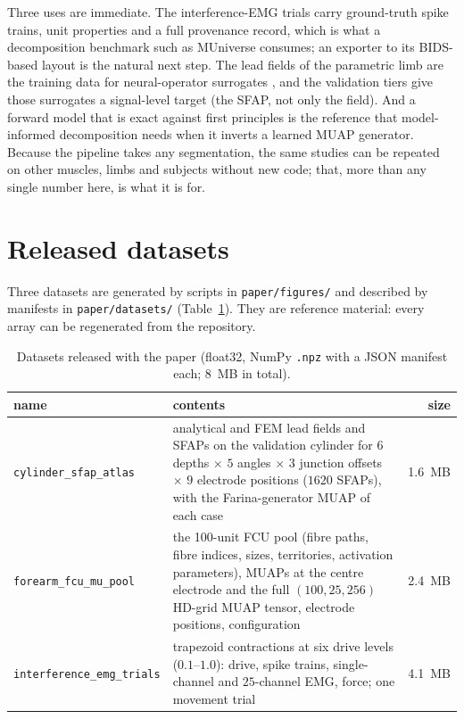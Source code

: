 \documentclass[11pt,a4paper]{article}
\begin{document}
Three uses are immediate. The interference-EMG trials carry ground-truth spike trains,
unit properties and a full provenance record, which is what a decomposition benchmark
such as MUniverse \citep{mamidanna2025muniverse} consumes; an exporter to its BIDS-based
layout is the natural next step. The lead fields of the parametric limb are the training
data for neural-operator surrogates \citep{halatsis2026neural}, and the validation tiers
give those surrogates a signal-level target (the SFAP, not only the field). And a forward
model that is exact against first principles is the reference that model-informed
decomposition \citep{halatsis2025bmiss} needs when it inverts a learned MUAP generator.
Because the pipeline takes any segmentation, the same studies can be repeated on other
muscles, limbs and subjects without new code; that, more than any single number here, is
what it is for.

\section{Released datasets}
\label{sec:datasets}
Three datasets are generated by scripts in \texttt{paper/figures/} and described by
manifests in \texttt{paper/datasets/} (Table~\ref{tab:data}). They are reference
material: every array can be regenerated from the repository.

\begin{table}[t]
\centering\small
\caption{Datasets released with the paper (float32, NumPy \texttt{.npz} with a JSON
manifest each; $8$~MB in total).}
\label{tab:data}
\begin{tabular}{lp{86mm}r}
\toprule
name & contents & size \\
\midrule
\texttt{cylinder\_sfap\_atlas} & analytical and FEM lead fields and SFAPs on the validation cylinder for $6$ depths $\times$ $5$ angles $\times$ $3$ junction offsets $\times$ $9$ electrode positions ($1620$ SFAPs), with the Farina-generator MUAP of each case & 1.6~MB \\
\texttt{forearm\_fcu\_mu\_pool} & the 100-unit FCU pool (fibre paths, fibre indices, sizes, territories, activation parameters), MUAPs at the centre electrode and the full $(100, 25, 256)$ HD-grid MUAP tensor, electrode positions, configuration & 2.4~MB \\
\texttt{interference\_emg\_trials} & trapezoid contractions at six drive levels ($0.1$--$1.0$): drive, spike trains, single-channel and $25$-channel EMG, force; one movement trial & 4.1~MB \\
\bottomrule
\end{tabular}
\end{table}
\end{document}
